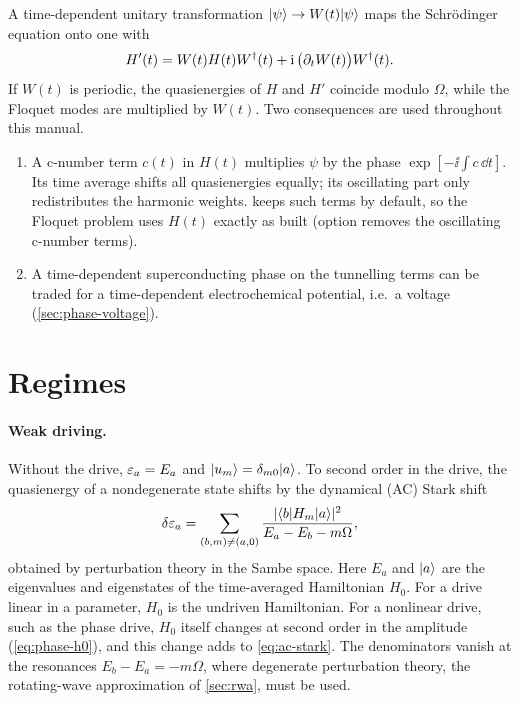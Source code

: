 A time-dependent unitary transformation $\lvert \psi\rangle\to W(t)\lvert \psi\rangle$ maps the Schr\"odinger
equation onto one with
\begin{equation}\label{eq:gauge}
  H'(t)=W(t)H(t)W^\dagger(t)+\mathrm{i}\,\bigl(\partial_tW(t)\bigr)W^\dagger(t).
\end{equation}
If $W(t)$ is periodic, the quasienergies of $H$ and $H'$ coincide modulo $\Omega$, while the
Floquet modes are multiplied by $W(t)$. Two consequences are used throughout this manual.
\begin{enumerate}
\item A c-number term $c(t)$ in $H(t)$ multiplies $\psi$ by the phase
$\exp[-\ii\int c\,\dd t]$. Its time average shifts all quasienergies equally; its
oscillating part only redistributes the harmonic weights. \pkg{} keeps such terms by
default, so the Floquet problem uses $H(t)$ exactly as built (option
 removes the oscillating c-number terms).
\item A time-dependent superconducting phase on the tunnelling terms can be traded for a
time-dependent electrochemical potential, i.e.\ a voltage (\cref{sec:phase-voltage}).
\end{enumerate}

\section{Regimes}\label{sec:regimes}

\paragraph{Weak driving.}
Without the drive, $\varepsilon_a=E_a$ and $\lvert u_m\rangle=\delta_{m0}\lvert a\rangle$. To second order in the
drive, the quasienergy of a nondegenerate state shifts by the dynamical (AC) Stark shift
\begin{equation}\label{eq:ac-stark}
  \delta\varepsilon_a=\sum_{(b,m)\ne(a,0)}\frac{\lvert \langle b\vert H_m\vert a\rangle\rvert^2}{E_a-E_b-m\Omega},
\end{equation}
obtained by perturbation theory in the Sambe space. Here $E_a$ and $\lvert a\rangle$ are the
eigenvalues and eigenstates of the time-averaged Hamiltonian $H_0$. For a drive linear in a
parameter, $H_0$ is the undriven Hamiltonian. For a nonlinear drive, such as the phase drive,
$H_0$ itself changes at second order in the amplitude (\cref{eq:phase-h0}), and this change
adds to \eqref{eq:ac-stark}. The denominators vanish at the resonances
$E_b-E_a=-m\Omega$, where degenerate perturbation theory, the rotating-wave approximation
of \cref{sec:rwa}, must be used.

